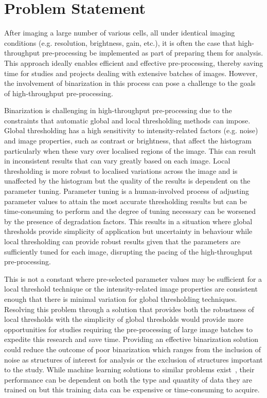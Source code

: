 \section{Problem Statement}\label{sec:problem_state}
After imaging a large number of various cells, all under identical imaging conditions (e.g. resolution, brightness, gain, etc.), it is often the case that high-throughput pre-processing be implemented as part of preparing them for analysis.  This approach ideally enables efficient and effective pre-processing, thereby saving time for studies and projects dealing with extensive batches of images. However, the involvement of binarization in this process can pose a challenge to the goals of high-throughput pre-processing. \par Binarization is challenging in high-throughput pre-processing due to the constraints that automatic global and local thresholding methods can impose. Global thresholding has a high sensitivity to intensity-related factors (e.g. noise) and image properties, such as contrast or brightness, that affect the histogram particularly when these vary over localised regions of the image. This can result in inconsistent results that can vary greatly based on each image. Local thresholding is more robust to localised variations across the image and is unaffected by the histogram but the quality of the results is dependent on the parameter tuning. Parameter tuning is a human-involved process of adjusting parameter values to attain the most accurate thresholding results but can be time-consuming to perform and the degree of tuning necessary can be worsened by the presence of degradation factors. This results in a situation where global thresholds provide simplicity of application but uncertainty in behaviour while local thresholding can provide robust results given that the parameters are sufficiently tuned for each image, disrupting the pacing of the high-throughput pre-processing.\par This is not a constant where pre-selected parameter values may be sufficient for a local threshold technique or the intensity-related image properties are consistent enough that there is minimal variation for global thresholding techniques. Resolving this problem through a solution that provides both the robustness of local thresholds with the simplicity of global thresholds would provide more opportunities for studies requiring the pre-processing of large image batches to expedite this research and save time. Providing an effective binarization solution could reduce the outcome of poor binarization which ranges from the inclusion of noise as structures of interest for analysis or the exclusion of structures important to the study. While machine learning solutions to similar problems exist~\cite{machine_segment}, their performance can be dependent on both the type and quantity of data they are trained on but this training data can be expensive or time-consuming to acquire.

